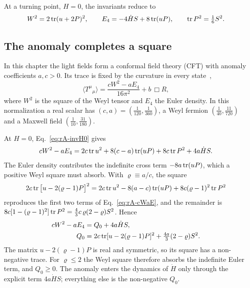 At a turning point, $H=0$, the invariants reduce to
\begin{equation}
W^2=2\operatorname{tr}(u+2P)^2,\qquad E_4=-4\dot HS+8\operatorname{tr}(uP),\qquad \operatorname{tr} P^2=\tfrac16S^2 .
\label{eq:rA-invH0}
\end{equation}

\subsection{The anomaly completes a square}
\label{rA:square}

In this chapter the light fields form a conformal field theory (CFT) with anomaly coefficients $a,c>0$.
Its trace is fixed by the curvature in every state~\cite{Duff:1993wm},
\begin{equation}
\langle T^\mu{}_\mu\rangle=\frac{cW^2-aE_4}{16\pi^2}+b\,\Box R ,
\label{eq:rA-anomaly}
\end{equation}
where $W^2$ is the square of the Weyl tensor and $E_4$ the Euler density.
In this normalization a real scalar has $(c,a)=(\tfrac1{120},\tfrac1{360})$, a Weyl fermion $(\tfrac1{40},\tfrac{11}{720})$ and a Maxwell field $(\tfrac1{10},\tfrac{31}{180})$.

At $H=0$, Eq.~\eqref{eq:rA-invH0} gives
\begin{equation}
cW^2-aE_4=2c\operatorname{tr} u^2+8(c-a)\operatorname{tr}(uP)+8c\operatorname{tr} P^2+4a\dot HS .
\label{eq:rA-cWaE}
\end{equation}
The Euler density contributes the indefinite cross term $-8a\operatorname{tr}(uP)$, which a positive Weyl square must absorb.
With $\varrho\equiv a/c$, the square
\begin{equation}
2c\operatorname{tr}\big[u-2(\varrho-1)P\big]^2=2c\operatorname{tr} u^2-8(a-c)\operatorname{tr}(uP)+8c(\varrho-1)^2\operatorname{tr} P^2
\end{equation}
reproduces the first two terms of Eq.~\eqref{eq:rA-cWaE}, and the remainder is $8c[1-(\varrho-1)^2]\operatorname{tr} P^2=\tfrac43c\,\varrho(2-\varrho)S^2$.
Hence
\begin{equation}
\begin{aligned}
cW^2-aE_4&=Q_0+4a\dot HS,\\
Q_0&=2c\operatorname{tr}[u-2(\varrho-1)P]^2+\tfrac{4a}{3}(2-\varrho)S^2 .
\end{aligned}
\label{eq:rA-square}
\end{equation}
The matrix $u-2(\varrho-1)P$ is real and symmetric, so its square has a non-negative trace.
For $\varrho\leq2$ the Weyl square therefore absorbs the indefinite Euler term, and $Q_0\geq0$.
The anomaly enters the dynamics of $\dot H$ only through the explicit term $4a\dot HS$; everything else is the non-negative $Q_0$.

